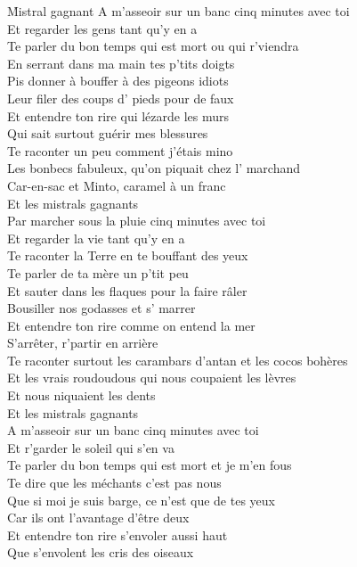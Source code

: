\documentclass{novel}
\begin{document}
\h*{Mistral gagnant}
A m'asseoir sur un banc cinq minutes avec toi \\
Et regarder les gens tant qu'y en a \\
Te parler du bon temps qui est mort ou qui r'viendra \\
En serrant dans ma main tes p'tits doigts \\
Pis donner à bouffer à des pigeons idiots \\
Leur filer des coups d' pieds pour de faux \\
Et entendre ton rire qui lézarde les murs \\
Qui sait surtout guérir mes blessures \\

Te raconter un peu comment j'étais mino \\
Les bonbecs fabuleux, qu'on piquait chez l' marchand \\
Car-en-sac et Minto, caramel à un franc \\
Et les mistrals gagnants \\

Par marcher sous la pluie cinq minutes avec toi \\
Et regarder la vie tant qu'y en a \\
Te raconter la Terre en te bouffant des yeux \\
Te parler de ta mère un p'tit peu \\
Et sauter dans les flaques pour la faire râler \\
Bousiller nos godasses et s' marrer \\
Et entendre ton rire comme on entend la mer \\
S'arrêter, r'partir en arrière \\
Te raconter surtout les carambars d'antan et les cocos bohères \\
Et les vrais roudoudous qui nous coupaient les lèvres \\
Et nous niquaient les dents \\
Et les mistrals gagnants \\

A m'asseoir sur un banc cinq minutes avec toi \\
Et r'garder le soleil qui s'en va \\
Te parler du bon temps qui est mort et je m'en fous \\
Te dire que les méchants c'est pas nous \\
Que si moi je suis barge, ce n'est que de tes yeux \\
Car ils ont l'avantage d'être deux \\
Et entendre ton rire s'envoler aussi haut \\
Que s'envolent les cris des oiseaux \\
\end{document}
